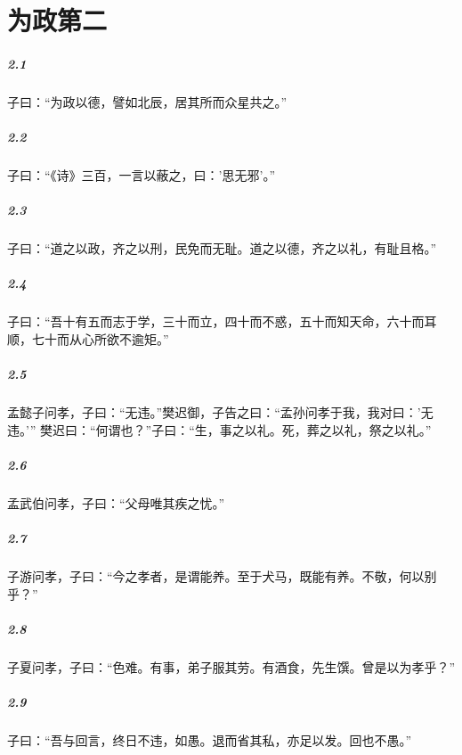 \documentclass[main.tex]{subfiles}
\begin{document}
\chapter{为政第二}

\paragraph{2.1}
子曰：“为政以德，譬如北辰，居其所而众星共之。”

\paragraph{2.2}
子曰：“《诗》三百，一言以蔽之，曰：’思无邪’。”

\paragraph{2.3}
子曰：“道之以政，齐之以刑，民免而无耻。道之以德，齐之以礼，有耻且格。”

\paragraph{2.4}
子曰：“吾十有五而志于学，三十而立，四十而不惑，五十而知天命，六十而耳顺，七十而从心所欲不逾矩。”

\paragraph{2.5}
孟懿子问孝，子曰：“无违。”樊迟御，子告之曰：“孟孙问孝于我，我对曰：’无违。’”
樊迟曰：“何谓也？”子曰：“生，事之以礼。死，葬之以礼，祭之以礼。”

\paragraph{2.6}
孟武伯问孝，子曰：“父母唯其疾之忧。”

\paragraph{2.7}
子游问孝，子曰：“今之孝者，是谓能养。至于犬马，既能有养。不敬，何以别乎？”

\paragraph{2.8}
子夏问孝，子曰：“色难。有事，弟子服其劳。有酒食，先生馔。曾是以为孝乎？”

\paragraph{2.9}
子曰：“吾与回言，终日不违，如愚。退而省其私，亦足以发。回也不愚。”
\end{document}
